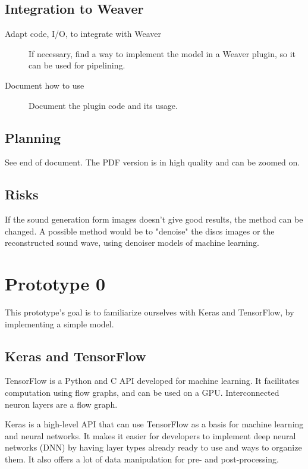\documentclass[12pt, twoside]{article}
\begin{document}
\subsection{Integration to Weaver}
\begin{description}
	\item[Adapt code, I/O, to integrate with Weaver] If necessary, find a way to implement the model in a Weaver plugin, so it can be used for pipelining.
	\item[Document how to use] Document the plugin code and its usage.
\end{description}
\subsection{Planning}
See end of document. The PDF version is in high quality and can be zoomed on.
\subsection{Risks}
If the sound generation form images doesn't give good results, the method can be changed. A possible method would be to "denoise" the discs images or the reconstructed sound wave, using denoiser models of machine learning.

\section{Prototype 0}
This prototype's goal is to familiarize ourselves with Keras and TensorFlow, by implementing a simple model.
\subsection{Keras and TensorFlow}
TensorFlow is a Python and C API developed for machine learning\cite{tf}. It facilitates computation using flow graphs, and can be used on a GPU. Interconnected neuron layers are a flow graph.

Keras is a high-level API that can use TensorFlow as a basis for machine learning and neural networks\cite{keras}. It makes it easier for developers to implement deep neural networks (DNN) by having layer types already ready to use and ways to organize them. It also offers a lot of data manipulation for pre- and post-processing.
\end{document}
